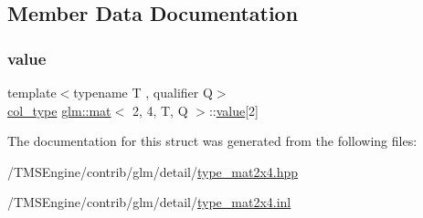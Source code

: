 \subsection{Member Data Documentation}
\mbox{\label{structglm_1_1mat_3_012_00_014_00_01_t_00_01_q_01_4_af1b1c45fac74697c901db6f2909b24f3}} 
\subsubsection{\texorpdfstring{value}{value}}
{\footnotesize\ttfamily template$<$typename T , qualifier Q$>$ \\
\hyperlink{structglm_1_1mat_3_012_00_014_00_01_t_00_01_q_01_4_ae14ad10a9d8ce3908ec89ae373a27872}{col\+\_\+type} \hyperlink{structglm_1_1mat}{glm\+::mat}$<$ 2, 4, T, Q $>$\+::\hyperlink{_s_d_l__opengl__glext_8h_a8ad81492d410ff2ac11f754f4042150f}{value}\mbox{[}2\mbox{]}\hspace{0.3cm}{\ttfamily [private]}}



The documentation for this struct was generated from the following files\+:\begin{DoxyCompactItemize}
\item 
/\+T\+M\+S\+Engine/contrib/glm/detail/\hyperlink{type__mat2x4_8hpp}{type\+\_\+mat2x4.\+hpp}\item 
/\+T\+M\+S\+Engine/contrib/glm/detail/\hyperlink{type__mat2x4_8inl}{type\+\_\+mat2x4.\+inl}\end{DoxyCompactItemize}
